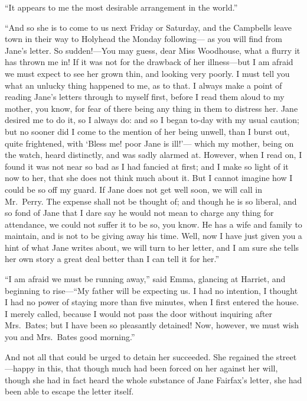 ``It appears to me the most desirable arrangement in the world.''

``And so she is to come to us next Friday or Saturday, and the
Campbells leave town in their way to Holyhead the Monday following---%
as you will find from Jane's letter.  So sudden!---You may guess,
dear Miss Woodhouse, what a flurry it has thrown me in!
If it was not for the drawback of her illness---but I am afraid
we must expect to see her grown thin, and looking very poorly.
I must tell you what an unlucky thing happened to me, as to that.
I always make a point of reading Jane's letters through to myself first,
before I read them aloud to my mother, you know, for fear of there
being any thing in them to distress her.  Jane desired me to do it,
so I always do:  and so I began to-day with my usual caution;
but no sooner did I come to the mention of her being unwell, than I
burst out, quite frightened, with `Bless me! poor Jane is ill!'---%
which my mother, being on the watch, heard distinctly, and was sadly
alarmed at.  However, when I read on, I found it was not near so bad
as I had fancied at first; and I make so light of it now to her,
that she does not think much about it.  But I cannot imagine
how I could be so off my guard.  If Jane does not get well soon,
we will call in Mr.\ Perry.  The expense shall not be thought of;
and though he is so liberal, and so fond of Jane that I dare say
he would not mean to charge any thing for attendance, we could not
suffer it to be so, you know.  He has a wife and family to maintain,
and is not to be giving away his time.  Well, now I have just given you
a hint of what Jane writes about, we will turn to her letter, and I am
sure she tells her own story a great deal better than I can tell it
for her.''

``I am afraid we must be running away,'' said Emma, glancing at Harriet,
and beginning to rise---``My father will be expecting us.
I had no intention, I thought I had no power of staying more than
five minutes, when I first entered the house.  I merely called,
because I would not pass the door without inquiring after Mrs.\ Bates;
but I have been so pleasantly detained!  Now, however, we must wish
you and Mrs.\ Bates good morning.''

And not all that could be urged to detain her succeeded.
She regained the street---happy in this, that though much had been
forced on her against her will, though she had in fact heard
the whole substance of Jane Fairfax's letter, she had been able
to escape the letter itself.



